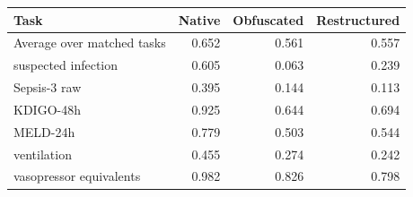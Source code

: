 \begin{tabular}{lrrr}
\toprule
Task & Native & Obfuscated & Restructured \\
\midrule
Average over matched tasks & 0.652 & 0.561 & 0.557 \\
suspected infection & 0.605 & 0.063 & 0.239 \\
Sepsis-3 raw & 0.395 & 0.144 & 0.113 \\
KDIGO-48h & 0.925 & 0.644 & 0.694 \\
MELD-24h & 0.779 & 0.503 & 0.544 \\
ventilation & 0.455 & 0.274 & 0.242 \\
vasopressor equivalents & 0.982 & 0.826 & 0.798 \\
\bottomrule
\end{tabular}
